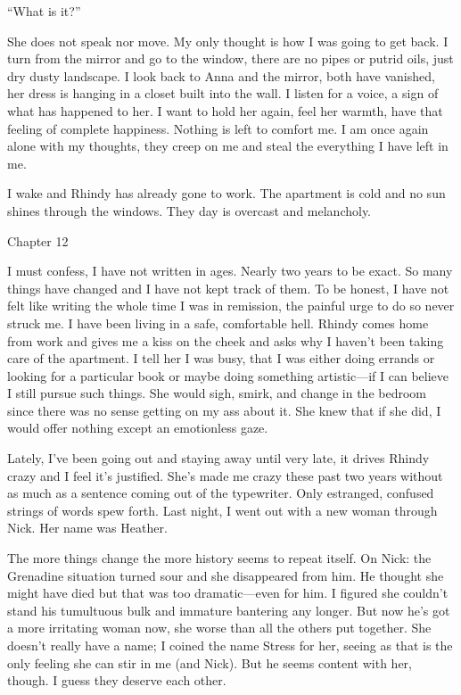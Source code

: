 ``What is it?''

She does not speak nor move. My only thought is how I was going to get
back. I turn from the mirror and go to the window, there are no pipes or
putrid oils, just dry dusty landscape. I look back to Anna and the
mirror, both have vanished, her dress is hanging in a closet built into
the wall. I listen for a voice, a sign of what has happened to her. I
want to hold her again, feel her warmth, have that feeling of complete
happiness. Nothing is left to comfort me. I am once again alone with my
thoughts, they creep on me and steal the everything I have left in me.

I wake and Rhindy has already gone to work. The apartment is cold and no
sun shines through the windows. They day is overcast and melancholy.

Chapter 12

I must confess, I have not written in ages. Nearly two years to be
exact. So many things have changed and I have not kept track of them. To
be honest, I have not felt like writing the whole time I was in
remission, the painful urge to do so never struck me. I have been living
in a safe, comfortable hell. Rhindy comes home from work and gives me a
kiss on the cheek and asks why I haven't been taking care of the
apartment. I tell her I was busy, that I was either doing errands or
looking for a particular book or maybe doing something artistic---if I
can believe I still pursue such things. She would sigh, smirk, and
change in the bedroom since there was no sense getting on my ass about
it. She knew that if she did, I would offer nothing except an
emotionless gaze.

Lately, I've been going out and staying away until very late, it drives
Rhindy crazy and I feel it's justified. She's made me crazy these past
two years without as much as a sentence coming out of the typewriter.
Only estranged, confused strings of words spew forth. Last night, I went
out with a new woman through Nick. Her name was Heather.

The more things change the more history seems to repeat itself. On Nick:
the Grenadine situation turned sour and she disappeared from him. He
thought she might have died but that was too dramatic---even for him. I
figured she couldn't stand his tumultuous bulk and immature bantering
any longer. But now he's got a more irritating woman now, she worse than
all the others put together. She doesn't really have a name; I coined
the name Stress for her, seeing as that is the only feeling she can stir
in me (and Nick). But he seems content with her, though. I guess they
deserve each other.


